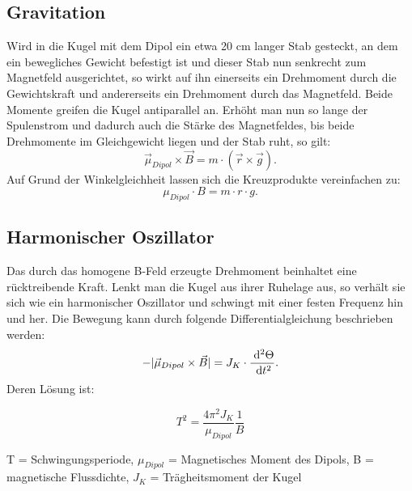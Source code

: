  \subsection{Gravitation}
Wird in die Kugel mit dem Dipol ein etwa 20 cm langer Stab gesteckt, an dem ein bewegliches Gewicht befestigt ist und dieser Stab nun senkrecht zum Magnetfeld ausgerichtet, so wirkt auf ihn einerseits ein Drehmoment durch die Gewichtskraft und andererseits ein Drehmoment durch das Magnetfeld. Beide Momente greifen die Kugel antiparallel an. Erhöht man nun so lange der Spulenstrom und dadurch auch die Stärke des Magnetfeldes, bis beide Drehmomente im Gleichgewicht liegen und der Stab ruht,
so gilt:
\begin{equation}
\vec{\mu}_{Dipol} \times \vec{B} = m\cdot (\vec{r} \times \vec{g} ).
\end{equation}
Auf Grund der Winkelgleichheit lassen sich die Kreuzprodukte vereinfachen zu:
\begin{equation}
\mu_{Dipol} \cdot B = m\cdot r \cdot g.
\label{grav}
\end{equation}
  
  \subsection{Harmonischer Oszillator}
  Das durch das homogene B-Feld erzeugte Drehmoment beinhaltet eine rücktreibende Kraft. Lenkt man die Kugel aus ihrer Ruhelage aus, so verhält sie sich wie ein harmonischer Oszillator und schwingt mit einer festen Frequenz hin und her.
Die Bewegung kann durch folgende Differentialgleichung beschrieben werden:
\begin{equation}
-|\vec{\mu}_{Dipol} \times \vec{B}| = J_K \cdot \frac{\; \mathrm{d}^2 \Theta}{\; \mathrm{d} t^2}.
\end{equation}
Deren Lösung ist:
\begin{formel}
\begin{equation}
T^2=\frac{4\pi^2J_K}{\mu_{Dipol}} \frac{1}{B}
\label{oszi}
\end{equation}
\caption*{\small{T = Schwingungsperiode, $\mu_{Dipol}$ = Magnetisches Moment des Dipols, B = magnetische Flussdichte, $J_K$ = Trägheitsmoment der Kugel}}
\end{formel}
